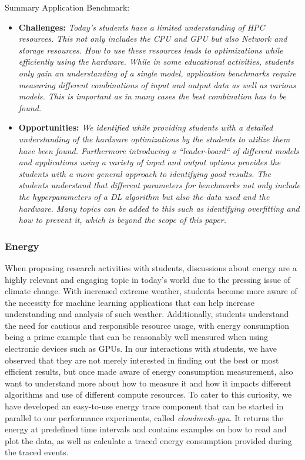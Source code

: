 \documentclass[utf8]{FrontiersinVancouver} %
\begin{document}
\begin{tcolorbox}
Summary Application Benchmark:

\begin{itemize}
\item {\bf Challenges:} {\it Today's students have a limited understanding of HPC resources. This not only includes the CPU and GPU but also Network and storage resources. How to use these resources leads to optimizations while efficiently using the hardware. While in some educational activities, students only gain an understanding of a single model, application benchmarks require measuring different combinations of input and output data as well as various models. This is important as in many cases the best combination has to be found. }
\item {\bf Opportunities:} {\it We identified while providing students with a detailed understanding of the hardware optimizations by the students to utilize them have been found. Furthermore introducing a ``leader-board`` of different models and applications using a variety of input and output options provides the students with a more general approach to identifying good results. The students understand that different parameters for benchmarks not only include the hyperparameters of a DL algorithm but also the data used and the hardware. Many topics can be added to this such as identifying overfitting and how to prevent it, which is beyond the scope of this paper.}
\end{itemize}
\end{tcolorbox}



\subsubsection{Energy}
\label{sec:perf-energy}


When proposing research activities with students, discussions about energy are a highly relevant and engaging topic in today's world due to the pressing issue of climate change. With increased extreme weather, students become more aware of the necessity for machine learning applications that can help increase understanding and analysis of such weather. Additionally, students understand the need for cautious and responsible resource usage, with energy consumption being a prime example that can be reasonably well measured when using electronic devices such as GPUs.
In our interactions with students, we have observed that they are not merely interested in finding out the best or most efficient results, but once made aware of energy consumption measurement, also want to understand more about how to measure it and how it impacts different algorithms and use of different compute resources.
To cater to this curiosity, we have developed an easy-to-use energy trace component that can be started in parallel to our performance experiments, called {\em cloudmesh-gpu}. It returns the energy at predefined time intervals and contains examples on how to read and plot the data, as well as calculate a traced energy consumption provided during the traced events.
\end{document}
